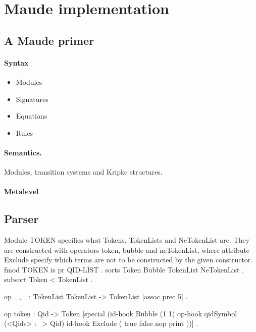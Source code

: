 \documentclass{llncs}%
\begin{document}
\section{Maude implementation}

\subsection{A Maude primer}

\paragraph{Syntax}
\begin{itemize}
    \item Modules
    \item Signatures
    \item Equations
    \item Rules
\end{itemize}

\paragraph{Semantics.} Modules, transition systems and Kripke structures. 

\paragraph{Metalevel}

\subsection{Parser}

Module {\Tt{}TOKEN\nwendquote} specifies what {\Tt{}Tokens\nwendquote}, {\Tt{}TokenLists\nwendquote} and {\Tt{}NeTokenList\nwendquote} are. They are constructed with operators {\Tt{}token\nwendquote}, {\Tt{}bubble\nwendquote} and {\Tt{}neTokenList\nwendquote}, where attribute {\Tt{}Exclude\nwendquote} specify which terms are not to be constructed by the given constructor.
\endmoddef\nwstartdeflinemarkup\nwenddeflinemarkup
 fmod TOKEN is
 pr QID-LIST .
 sorts Token Bubble TokenList NeTokenList .
 subsort Token < TokenList .

 op _,_ : TokenList TokenList -> TokenList [assoc prec 5] .

 op token : Qid -> Token
    [special
      (id-hook Bubble        (1 1)
       op-hook qidSymbol     (<Qids> : ~> Qid)
       id-hook Exclude       ( true false nop print ))] .
\end{document}

